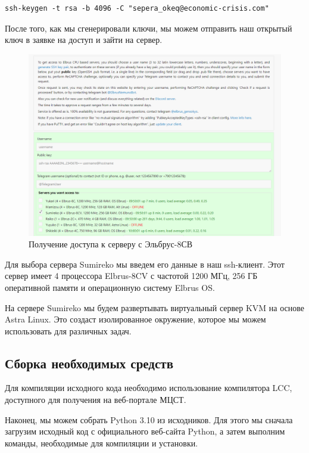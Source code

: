 \begin{verbatim}
ssh-keygen -t rsa -b 4096 -C "sepera_okeq@economic-crisis.com"
\end{verbatim}

После того, как мы сгенерировали ключи, мы можем отправить наш открытый ключ в заявке на доступ и зайти на сервер.

\begin{figure}
  \centering
  \includegraphics[width=.9\textwidth]{graphics/img/elbrus_dostyp.png}
  \caption{Получение доступа к серверу с Эльбрус-8СВ}
  \label{fig:elbrus-dostup}
\end{figure}

Для выбора сервера Sumireko мы введем его данные в наш ssh-клиент. Этот сервер имеет 4 процессора Elbrus-8CV с частотой 1200 МГц, 256 ГБ оперативной памяти и операционную систему Elbrus OS.

На сервере Sumireko мы будем развертывать виртуальный сервер KVM на основе Astra Linux. Это создаст изолированное окружение, которое мы можем использовать для различных задач.

\subsection{Сборка необходимых средств}

Для компиляции исходного кода необходимо использование компилятора LCC, доступного для получения на веб-портале МЦСТ.

Наконец, мы можем собрать Python 3.10 из исходников. Для этого мы сначала загрузим исходный код с официального веб-сайта Python, а затем выполним команды, необходимые для компиляции и установки.

\begin{listing}[H]
\end{listing}
\label{lst:c}

